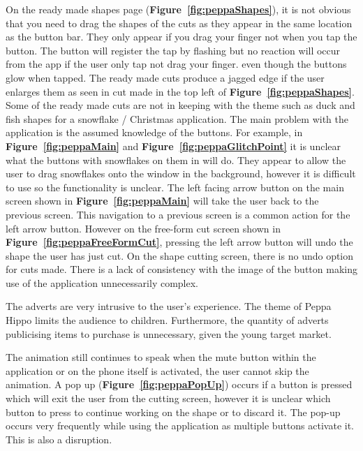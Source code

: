 \documentclass[11pt]{article}
\begin{document}
                    On the ready made shapes page (\textbf{Figure~\ref{fig:peppaShapes}}), it is not obvious that you need to drag the shapes of the cuts as they appear in the same location as the button bar. They only appear if you drag your finger not when you tap the button. The button will register the tap by flashing but no reaction will occur from the app if the user only tap not drag your finger.  even though the buttons glow when tapped. The ready made cuts produce a jagged edge if the user enlarges them as seen in cut made in the top left of \textbf{Figure~\ref{fig:peppaShapes}}. Some of the ready made cuts are not in keeping with the theme such as duck and fish shapes for a snowflake / Christmas application. 
                    The main problem with the application is the assumed knowledge of the buttons. For example, in \textbf{Figure~\ref{fig:peppaMain}} and \textbf{Figure~\ref{fig:peppaGlitchPoint}} it is unclear what the buttons with snowflakes on them in will do. They appear to allow the user to drag snowflakes onto the window in the background, however it is difficult to use so the functionality is unclear. The left facing arrow button on the main screen shown in \textbf{Figure~\ref{fig:peppaMain}} will take the user back to the previous screen. This navigation to a previous screen is a common action for the left arrow button. However on the free-form cut screen shown in \textbf{Figure~\ref{fig:peppaFreeFormCut}}, pressing the left arrow button will undo the shape the user has just cut.
                 On the shape cutting screen, there is no undo option for cuts made. There is a lack of consistency with the image of the button making use of the application unnecessarily complex.
                
                The adverts are very intrusive to the user's experience. The theme of Peppa Hippo limits the audience to children. Furthermore, the quantity of adverts publicising items to purchase is unnecessary, given the young target market.

                
                
                The animation still continues to speak when the mute button within the application or on the phone itself is activated, the user cannot skip the animation. A pop up (\textbf{Figure~\ref{fig:peppaPopUp}}) occurs if a button is pressed which will exit the user from the cutting screen, however it is unclear which button to press to continue working on the shape or to discard it. The pop-up occurs very frequently while using the application as multiple buttons activate it. This is also a disruption. 
                
\end{document}
